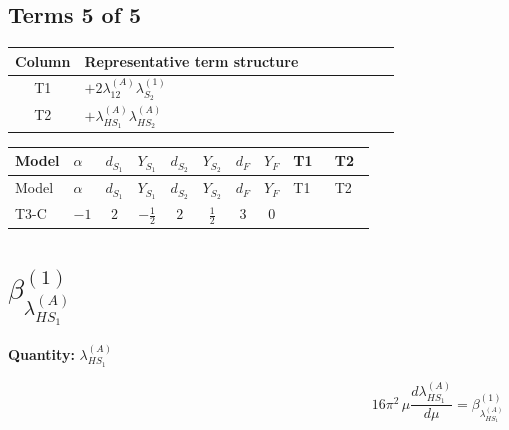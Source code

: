 \documentclass[8pt]{article}
\begin{document}
\begin{landscape}
\subsection*{Terms 5 of 5}
\begin{center}
\begin{tabular}{@{}c >{\raggedright\arraybackslash}p{0.82\linewidth}@{}}
\toprule
Column & Representative term structure \\
\midrule
T1 & \(\displaystyle +2 {\lambda_{12}^{(A)}} {\lambda_{S_2}^{(1)}}\) \\
\midrule
T2 & \(\displaystyle +{\lambda_{HS_1}^{(A)}} {\lambda_{HS_2}^{(A)}}\) \\
\midrule
\bottomrule
\end{tabular}
\end{center}
\smallskip
\tiny
\begin{longtable}{@{}llcccccc >{\raggedright\arraybackslash}p{0.21\linewidth} >{\raggedright\arraybackslash}p{0.21\linewidth}@{}}
\toprule
Model & $\alpha$ & $d_{S_1}$ & $Y_{S_1}$ & $d_{S_2}$ & $Y_{S_2}$ & $d_F$ & $Y_F$ & T1 & T2 \\
\midrule
\endfirsthead
\toprule
Model & $\alpha$ & $d_{S_1}$ & $Y_{S_1}$ & $d_{S_2}$ & $Y_{S_2}$ & $d_F$ & $Y_F$ & T1 & T2 \\
\midrule
\endhead
T3-C & $-1$ & $2$ & $-\frac{1}{2}$ & $2$ & $\frac{1}{2}$ & $3$ & $0$ & \scriptsize\adjustbox{max width=\linewidth}{$\begin{gathered} +2 {\lambda_{12}^{(A)}} {\lambda_{S_2}^{(1)}}\end{gathered}$} & \scriptsize\adjustbox{max width=\linewidth}{$\begin{gathered} +{\lambda_{HS_1}^{(A)}} {\lambda_{HS_2}^{(A)}}\end{gathered}$} \\
\midrule
\bottomrule
\end{longtable}
\clearpage
\section*{$\beta_{\lambda_{HS_1}^{(A)}}^{(1)}$}
\noindent\textbf{Quantity: }$\lambda_{HS_1}^{(A)}$\par\smallskip
\[16\pi^2\,\mu\frac{d \lambda_{HS_1}^{(A)}}{d\mu}=\beta_{\lambda_{HS_1}^{(A)}}^{(1)}\]

\end{landscape}
\end{document}
